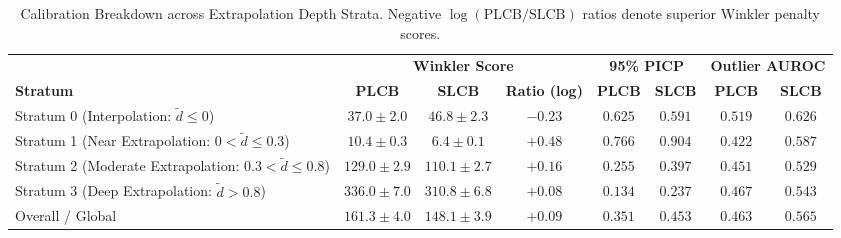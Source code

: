 \begin{table}[htbp]
\centering
\caption{Calibration Breakdown across Extrapolation Depth Strata. Negative $\log(\text{PLCB}/\text{SLCB})$ ratios denote superior Winkler penalty scores.}
\label{tab:strata_breakdown}
\small
\begin{tabular}{l ccc cccc}
\toprule
 & \multicolumn{3}{c}{\textbf{Winkler Score}} & \multicolumn{2}{c}{\textbf{95\% PICP}} & \multicolumn{2}{c}{\textbf{Outlier AUROC}} \\
\cmidrule(lr){2-4} \cmidrule(lr){5-6} \cmidrule(lr){7-8}
\textbf{Stratum} & \textbf{PLCB} & \textbf{SLCB} & \textbf{Ratio (log)} & \textbf{PLCB} & \textbf{SLCB} & \textbf{PLCB} & \textbf{SLCB} \\
\midrule
Stratum 0 (Interpolation: $\tilde d \le 0$) & $37.0 \pm 2.0$ & $46.8 \pm 2.3$ & $-0.23$ & $0.625$ & $0.591$ & $0.519$ & $0.626$ \\
Stratum 1 (Near Extrapolation: $0 < \tilde d \le 0.3$) & $10.4 \pm 0.3$ & $6.4 \pm 0.1$ & $+0.48$ & $0.766$ & $0.904$ & $0.422$ & $0.587$ \\
Stratum 2 (Moderate Extrapolation: $0.3 < \tilde d \le 0.8$) & $129.0 \pm 2.9$ & $110.1 \pm 2.7$ & $+0.16$ & $0.255$ & $0.397$ & $0.451$ & $0.529$ \\
Stratum 3 (Deep Extrapolation: $\tilde d > 0.8$) & $336.0 \pm 7.0$ & $310.8 \pm 6.8$ & $+0.08$ & $0.134$ & $0.237$ & $0.467$ & $0.543$ \\
Overall / Global & $161.3 \pm 4.0$ & $148.1 \pm 3.9$ & $+0.09$ & $0.351$ & $0.453$ & $0.463$ & $0.565$ \\
\bottomrule
\end{tabular}
\end{table}